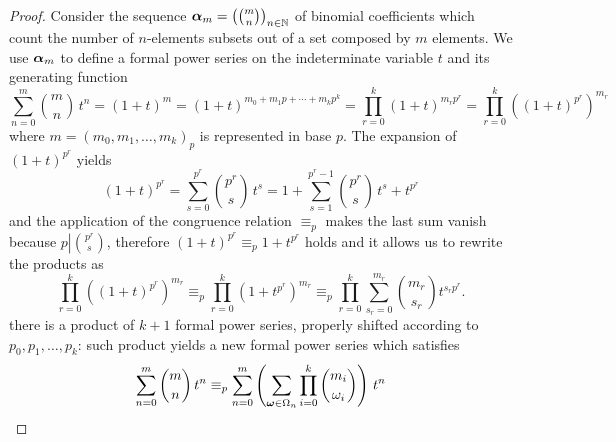 \iffalse
\begin{proof}
    Consider the sequence
    $\boldsymbol{\alpha}_{m}=\left({{m}\choose{n}}\right)_{n\in\mathbb{N}}$ of
    binomial coefficients which count the number of $n$-elements subsets out of
    a set composed by $m$ elements. We use $\boldsymbol{\alpha}_{m}$ to
    define a formal power series on the indeterminate variable $t$ and its generating
    function
    \begin{displaymath}
            \sum_{n=0}^{m}{{{m}\choose{n}}\,t^{n}} %
                = \left(1+t\right)^{m}
                = \left(1+t\right)^{m_{0}+m_{1}p+\cdots+m_{k}p^{k}}%
                = \prod_{r=0}^{k}{{\left(1+t\right)^{m_{r}p^{r}}}}
                = \prod_{r=0}^{k}{\left(\left(1+t\right)^{p^{r}}\right)^{m_{r}}}
    \end{displaymath} 
    where $m=\left(m_{0},m_{1},\ldots,m_{k}\right)_{p}$ is represented in 
    base $p$. The expansion of $\left(1+t\right)^{p^{r}}$ yields
    \begin{displaymath}
            \left(1+t\right)^{p^{r}} = \sum_{s=0}^{p^{r}}{{{p^{r}}\choose{s}}\,t^{s}}
                = 1+\sum_{s=1}^{p^{r}-1}{{{p^{r}}\choose{s}}\,t^{s}}+t^{p^{r}}
    \end{displaymath}
    and the application of the congruence relation $\equiv_{p}$ makes the last sum
    vanish because $\displaystyle p\left|{{p^{r}}\choose{s}}\right.$, therefore
    $\left(1+t\right)^{p^{r}} \equiv_{p} 1+t^{p^{r}}$ holds and it allows us to rewrite
    the products as
    \begin{displaymath}
            \prod_{r=0}^{k}{\left(\left(1+t\right)^{p^{r}}\right)^{m_{r}}}
                \equiv_{p} \prod_{r=0}^{k}{\left(1+t^{p^{r}}\right)^{m_{r}}}
                \equiv_{p} \prod_{r=0}^{k}{\sum_{s_{r}=0}^{m_{r}}{{{m_{r}}\choose{s_{r}}}t^{s_{r}p^{r}}}}.
    \end{displaymath}
    there is a product of $k+1$ formal power series, properly shifted according to 
    $p_{0},p_{1},\ldots,p_{k}$: such product yields a new formal power series which satisfies
    \begin{displaymath}
        \sum_{n=0}^{m}{{{m}\choose{n}}\,t^{n}} 
        \equiv_{p}
        \sum_{n=0}^{m}{\left(\sum_{\boldsymbol{\omega}\in\Omega_{n}}{\prod_{i=0}^{k}{{{m_{i}}\choose{\omega_{i}}}}}\right)\,t^{n}}
    \end{displaymath}

\end{proof}
